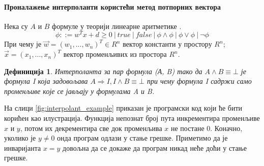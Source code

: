 \documentclass[a4paper]{article}
\newtheorem{definic}{Дефиниција}
\begin{document}
{%

\paragraph{Проналажење интерполанти користећи метод потпорних вектора}
\label{sssec:interpolant_svm}

Нека су $A$ и $B$ формуле у теорији линеарне аритметике \cite{Kroening2008}.
\begin{equation}
\phi ::= w^Tx + d \geq 0 \ | \ true \ | \ false \ | \ \phi \land \phi \ | \ \phi \lor \phi \ | \ \neg \phi
\end{equation}
При чему је $\vec{w} = (w_1, ..., w_n)^T \in R^n$ вектор константи у простору $R^n$; $\vec{x} = (x_1, ..., x_n)^T$
вектор променљивих из простора $R^n$.

\begin{definic}
Интерполанта за пар формула (А, B) тако да $A \land B \equiv \bot$ је формула I која задовољава $A \Rightarrow I, I \land B \equiv \bot$
при чему формула I садржи само променљиве које се јављају у формулама A и B.
\end{definic}

На слици \ref{fig:interpolant_example} приказан је програмски код који ће бити корићен као илустрација.
Функција непознат број пута инкрементира променљиве $x$ и $y$, потом их декрементира све док променљива $x$
не постане 0. Коначно, уколико је $y \neq 0$ онда програм одлази у стање грешке.
Приметимо да је инваријанта $x = y$ довољна да се докаже да програм никад неће доћи у стање грешке.

}
\end{document}
